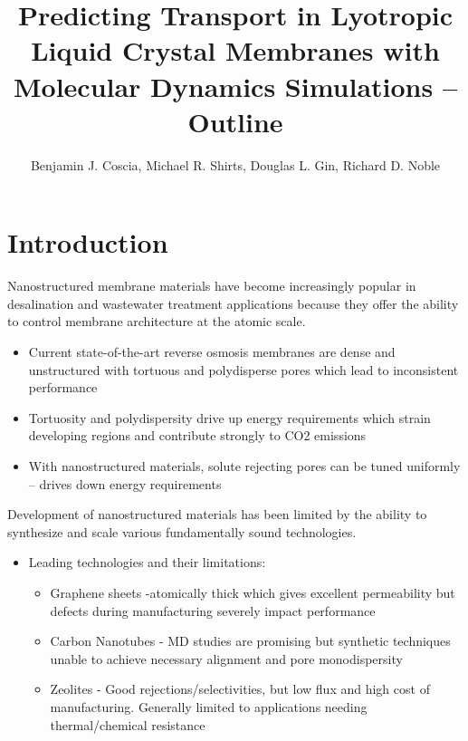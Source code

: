 \documentclass{article}
\title{Predicting Transport in Lyotropic Liquid Crystal Membranes with Molecular Dynamics Simulations -- Outline}
\author{Benjamin J. Coscia, Michael R. Shirts, Douglas L. Gin, Richard D. Noble}
\begin{document}
	
	\maketitle
	\section{Introduction}
	
	Nanostructured membrane materials have become increasingly popular in desalination and wastewater treatment applications because they offer the ability to control membrane architecture at the atomic scale.
	\begin{itemize}
		\item Current state-of-the-art reverse osmosis membranes are dense and unstructured with tortuous and polydisperse pores which lead to inconsistent performance
		\item Tortuosity and polydispersity drive up energy requirements which strain developing regions and contribute strongly to CO2 emissions
		\item With nanostructured materials, solute rejecting pores can be tuned uniformly -- drives down energy requirements
	\end{itemize}
	
	Development of nanostructured materials has been limited by the ability to synthesize and scale various fundamentally sound technologies.
	\begin{itemize}
		\item Leading technologies and their limitations:
		\begin{itemize}
			\item Graphene sheets -atomically thick which gives excellent permeability but defects during manufacturing severely impact performance
			\item Carbon Nanotubes - MD studies are promising but synthetic techniques unable to achieve necessary alignment and pore monodispersity
			\item Zeolites - Good rejections/selectivities, but low flux and high cost of manufacturing. Generally limited to applications needing thermal/chemical resistance
		\end{itemize}
	\end{itemize} 
	
\end{document}
